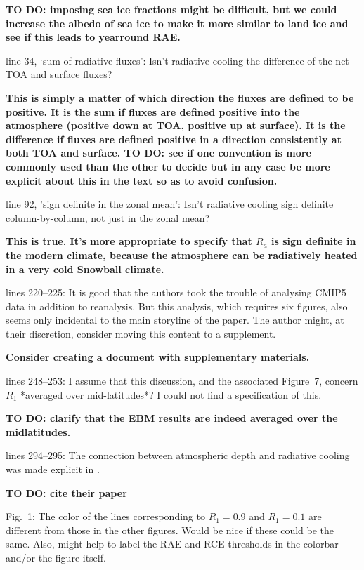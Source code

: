 \documentclass{article}
\begin{document}
{\color{red}\textbf{TO DO: imposing sea ice fractions might be difficult, but we could increase the albedo of sea ice to make it more similar to land ice and see if this leads to yearround RAE.}}

line 34, `sum of radiative fluxes': Isn't radiative cooling the difference of the net TOA and surface fluxes?

{\color{red}\textbf{This is simply a matter of which direction the fluxes are defined to be positive. It is the sum if fluxes are defined positive into the atmosphere (positive down at TOA, positive up at surface). It is the difference if fluxes are defined positive in a direction consistently at both TOA and surface. TO DO: see if one convention is more commonly used than the other to decide but in any case be more explicit about this in the text so as to avoid confusion.}}

line 92, 'sign definite in the zonal mean': Isn't radiative cooling sign definite column-by-column, not just in the zonal mean?

{\color{red}\textbf{This is true. It's more appropriate to specify that $R_a$ is sign definite in the modern climate, because the atmosphere can be radiatively heated in a very cold Snowball climate.}}

lines 220--225: It is good that the authors took the trouble of analysing CMIP5 data in addition to reanalysis. But this analysis, which requires six figures, also seems only incidental to the main storyline of the paper. The author might, at their discretion, consider moving this content to a supplement.

{\color{red}\textbf{Consider creating a document with supplementary materials.}}

lines 248--253: I assume that this discussion, and the associated Figure~7, concern $R_1$ *averaged over mid-latitudes*? I could not find a specification of this.

{\color{red}\textbf{TO DO: clarify that the EBM results are indeed averaged over the midlatitudes.}}

lines 294--295: The connection between atmospheric depth and radiative cooling was made explicit in \cite{jeevanjee2018}.

{\color{red}\textbf{TO DO: cite their paper}}

Fig.~1: The color of the lines corresponding to $R_1=0.9$ and $R_1=0.1$ are different from those in the other figures. Would be nice if these could be the same. Also, might help to label the RAE and RCE thresholds in the colorbar and/or the figure itself.
\end{document}
